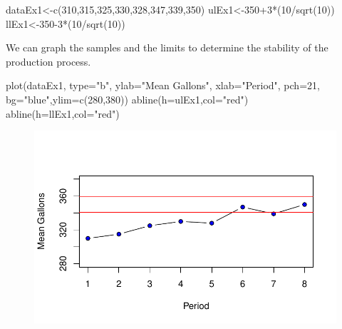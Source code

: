\documentclass[
  letterpaper,
  DIV=11,
  numbers=noendperiod]{scrreprt}
\newenvironment{Shaded}{\begin{snugshade}}{\end{snugshade}}
\newcommand{\AttributeTok}[1]{\textcolor[rgb]{0.40,0.45,0.13}{#1}}
\newcommand{\DecValTok}[1]{\textcolor[rgb]{0.68,0.00,0.00}{#1}}
\newcommand{\FunctionTok}[1]{\textcolor[rgb]{0.28,0.35,0.67}{#1}}
\newcommand{\NormalTok}[1]{\textcolor[rgb]{0.00,0.23,0.31}{#1}}
\newcommand{\OtherTok}[1]{\textcolor[rgb]{0.00,0.23,0.31}{#1}}
\newcommand{\SpecialCharTok}[1]{\textcolor[rgb]{0.37,0.37,0.37}{#1}}
\newcommand{\StringTok}[1]{\textcolor[rgb]{0.13,0.47,0.30}{#1}}
\begin{document}
\begin{Shaded}
\begin{Highlighting}[numbers=left,,]
\NormalTok{dataEx1}\OtherTok{\textless{}{-}}\FunctionTok{c}\NormalTok{(}\DecValTok{310}\NormalTok{,}\DecValTok{315}\NormalTok{,}\DecValTok{325}\NormalTok{,}\DecValTok{330}\NormalTok{,}\DecValTok{328}\NormalTok{,}\DecValTok{347}\NormalTok{,}\DecValTok{339}\NormalTok{,}\DecValTok{350}\NormalTok{)}
\NormalTok{ulEx1}\OtherTok{\textless{}{-}}\DecValTok{350}\SpecialCharTok{+}\DecValTok{3}\SpecialCharTok{*}\NormalTok{(}\DecValTok{10}\SpecialCharTok{/}\FunctionTok{sqrt}\NormalTok{(}\DecValTok{10}\NormalTok{))}
\NormalTok{llEx1}\OtherTok{\textless{}{-}}\DecValTok{350{-}3}\SpecialCharTok{*}\NormalTok{(}\DecValTok{10}\SpecialCharTok{/}\FunctionTok{sqrt}\NormalTok{(}\DecValTok{10}\NormalTok{))}
\end{Highlighting}
\end{Shaded}

We can graph the samples and the limits to determine the stability of
the production process.

\begin{Shaded}
\begin{Highlighting}[numbers=left,,]
\FunctionTok{plot}\NormalTok{(dataEx1, }\AttributeTok{type=}\StringTok{"b"}\NormalTok{, }\AttributeTok{ylab=}\StringTok{"Mean Gallons"}\NormalTok{,}
     \AttributeTok{xlab=}\StringTok{"Period"}\NormalTok{, }\AttributeTok{pch=}\DecValTok{21}\NormalTok{, }\AttributeTok{bg=}\StringTok{"blue"}\NormalTok{,}\AttributeTok{ylim=}\FunctionTok{c}\NormalTok{(}\DecValTok{280}\NormalTok{,}\DecValTok{380}\NormalTok{))}
\FunctionTok{abline}\NormalTok{(}\AttributeTok{h=}\NormalTok{ulEx1,}\AttributeTok{col=}\StringTok{"red"}\NormalTok{)}
\FunctionTok{abline}\NormalTok{(}\AttributeTok{h=}\NormalTok{llEx1,}\AttributeTok{col=}\StringTok{"red"}\NormalTok{)}
\end{Highlighting}
\end{Shaded}

\begin{figure}[H]

{\centering \includegraphics{./12-InferenceI_files/figure-pdf/unnamed-chunk-20-1.pdf}

}

\end{figure}
\end{document}
